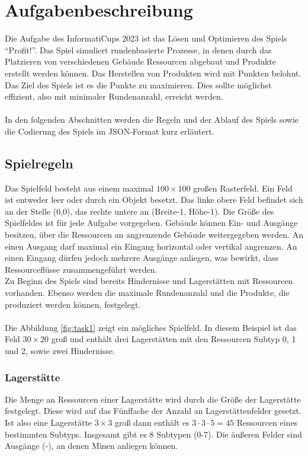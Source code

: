 \section{Aufgabenbeschreibung}\label{cap:aufgabenbeschriebung}
Die Aufgabe des InformatiCups 2023 ist das Lösen und Optimieren des Spiels “Profit!”. 
Das Spiel simuliert rundenbasierte Prozesse, in denen durch das Platzieren von verschiedenen Gebäude Ressourcen abgebaut und Produkte erstellt werden können. Das Herstellen von Produkten wird mit Punkten belohnt. Das Ziel des Spiels ist es die Punkte zu maximieren. Dies sollte möglichst effizient, also mit minimaler Rundenanzahl, erreicht werden.
\\\\
In den folgenden Abschnitten werden die Regeln und der Ablauf des Spiels sowie die Codierung des Spiels im JSON-Format kurz erläutert.

\subsection{Spielregeln}\label{cap:spielregeln}
Das Spielfeld besteht aus einem maximal $100\times100$ großen Rasterfeld. Ein Feld ist entweder leer oder durch ein Objekt besetzt. Das linke obere Feld befindet sich an der Stelle (0,0), das rechte untere an (Breite-1, Höhe-1). Die Größe des Spielfeldes ist für jede Aufgabe vorgegeben. Gebäude können Ein- und Ausgänge besitzen, über die Ressourcen an angrenzende Gebäude weitergegeben werden. An einen Ausgang darf maximal ein Eingang horizontal oder vertikal angrenzen. An einen Eingang dürfen jedoch mehrere Ausgänge anliegen, was bewirkt, dass Ressourceflüsse zusammengeführt werden. 
\\
Zu Beginn des Spiels sind bereits Hindernisse und Lagerstätten mit Ressourcen vorhanden.
Ebenso werden die maximale Rundenanzahl und die Produkte, die produziert werden können, festgelegt.
\\\\
Die Abbildung \ref{fig:task1} zeigt ein mögliches Spielfeld. In diesem Beispiel ist das Feld $30\times20$ groß und enthält drei Lagerstätten mit den Ressourcen Subtyp 0, 1 und 2, sowie zwei Hindernisse.


\subsubsection*{Lagerstätte}
Die Menge an Ressourcen einer Lagerstätte wird durch die Größe der Lagerstätte festgelegt.  Diese wird  auf das Fünffache der Anzahl an Lagerstättenfelder gesetzt. Ist also eine Lagerstätte $3 \times 3$ groß dann enthält es $3\cdot 3 \cdot 5 = 45$ Ressourcen eines bestimmten Subtyps. Insgesamt gibt es 8 Subtypen (0-7). Die äußeren Felder sind Ausgänge (-), an denen Minen anliegen können.

